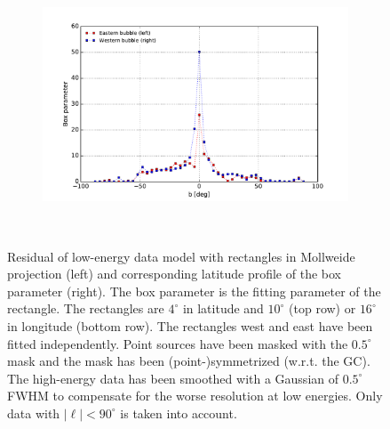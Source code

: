 \documentclass[a4paper]{article}
\begin{document}
\begin{figure}
{\begin{subfigure}[b]{.5\textwidth}
	\end{subfigure}%
	\begin{subfigure}[b]{.5\textwidth}
		\centering
		\includegraphics[width=.95\textwidth]{FitE_boxprof_at_0-1_to_1-1663_16sym.pdf}
	\end{subfigure}%
	}\\
\caption{Residual of low-energy data model with rectangles in Mollweide projection (left) and corresponding latitude profile of the box parameter (right). The box parameter is the fitting parameter of the rectangle. The rectangles are $4^\circ$ in latitude and $10^\circ$ (top row) or $16^\circ$ in longitude (bottom row). The rectangles west and east have been fitted independently. Point sources have been masked with the $0.5^\circ$ mask and the mask has been (point-)symmetrized (w.r.t. the GC). The high-energy data has been smoothed with a Gaussian of $0.5^\circ$ FWHM to compensate for the worse resolution at low energies. Only data with $|\ell| < 90^\circ$ is taken into account.}
\label{boxes_fit}
\end{figure}
\end{document}
